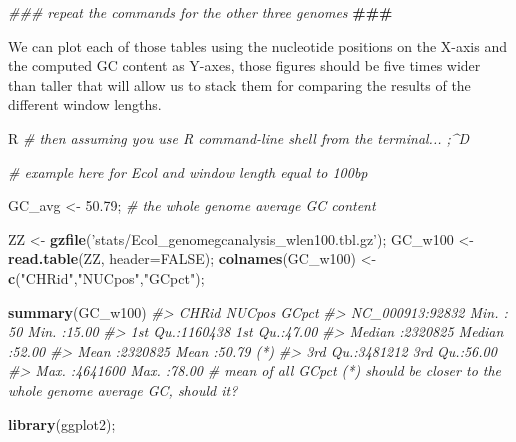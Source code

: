 \documentclass[10pt,a4paper,]{article}
\newenvironment{Shaded}{}{}
\newcommand{\AlertTok}[1]{\textcolor[rgb]{1.00,0.00,0.00}{\textbf{#1}}}
\newcommand{\CommentTok}[1]{\textcolor[rgb]{0.38,0.63,0.69}{\textit{#1}}}
\newcommand{\DataTypeTok}[1]{\textcolor[rgb]{0.56,0.13,0.00}{#1}}
\newcommand{\FloatTok}[1]{\textcolor[rgb]{0.25,0.63,0.44}{#1}}
\newcommand{\KeywordTok}[1]{\textcolor[rgb]{0.00,0.44,0.13}{\textbf{#1}}}
\newcommand{\NormalTok}[1]{#1}
\newcommand{\OtherTok}[1]{\textcolor[rgb]{0.00,0.44,0.13}{#1}}
\newcommand{\StringTok}[1]{\textcolor[rgb]{0.25,0.44,0.63}{#1}}
\begin{document}
\begin{Shaded}
\begin{Highlighting}[]
\CommentTok{### repeat the commands for the other three genomes }\AlertTok{###}
\end{Highlighting}
\end{Shaded}

We can plot each of those tables using the nucleotide positions on the
X-axis and the computed GC content as Y-axes, those figures should be
five times wider than taller that will allow us to stack them for
comparing the results of the different window lengths.

\begin{Shaded}
\begin{Highlighting}[]
\NormalTok{R}
\CommentTok{# then assuming you use R command-line shell from the terminal... ;^D}

\CommentTok{# example here for Ecol and window length equal to 100bp}

\NormalTok{GC_avg <-}\StringTok{ }\FloatTok{50.79}\NormalTok{; }\CommentTok{# the whole genome average GC content}

\NormalTok{ZZ <-}\StringTok{ }\KeywordTok{gzfile}\NormalTok{(}\StringTok{'stats/Ecol_genomegcanalysis_wlen100.tbl.gz'}\NormalTok{);}
\NormalTok{GC_w100 <-}\StringTok{ }\KeywordTok{read.table}\NormalTok{(ZZ, }\DataTypeTok{header=}\OtherTok{FALSE}\NormalTok{);}
\KeywordTok{colnames}\NormalTok{(GC_w100) <-}\StringTok{ }\KeywordTok{c}\NormalTok{(}\StringTok{"CHRid"}\NormalTok{,}\StringTok{"NUCpos"}\NormalTok{,}\StringTok{"GCpct"}\NormalTok{);}

\KeywordTok{summary}\NormalTok{(GC_w100)}
\CommentTok{#>        CHRid           NUCpos            GCpct      }
\CommentTok{#>  NC_000913:92832   Min.   :     50   Min.   :15.00  }
\CommentTok{#>                    1st Qu.:1160438   1st Qu.:47.00  }
\CommentTok{#>                    Median :2320825   Median :52.00  }
\CommentTok{#>                    Mean   :2320825   Mean   :50.79 (*)}
\CommentTok{#>                    3rd Qu.:3481212   3rd Qu.:56.00  }
\CommentTok{#>                    Max.   :4641600   Max.   :78.00}
\CommentTok{# mean of all GCpct (*) should be closer to the whole genome average GC, should it?}

\KeywordTok{library}\NormalTok{(ggplot2);}


\end{Highlighting}
\end{Shaded}
\end{document}

